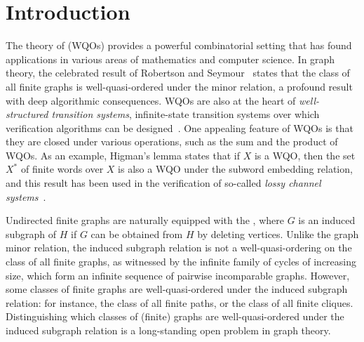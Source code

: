 \section{Introduction}
\label{sec:introduction}

\AP The theory of  (WQOs)
provides a powerful combinatorial setting that has found
applications in various areas of mathematics and computer
science. In graph theory, the celebrated result of
Robertson and Seymour~\cite{ROBSEY04} states that the
class of all finite graphs is well-quasi-ordered under
the minor relation, a profound result with deep
algorithmic consequences. WQOs are also at the heart of
\emph{well-structured transition systems}, infinite-state
transition systems over which verification algorithms can
be designed~\cite{ABDU96,ABDU98}. One appealing feature
of WQOs is that they are closed under various operations,
such as the sum and the product of WQOs. As an example,
Higman's lemma \cite{HIG52} states that if $X$ is a WQO,
then the set $X^*$ of finite words over $X$ is also a WQO
under the subword embedding relation, and this result has
been used in the verification of so-called \emph{lossy
channel systems}~\cite{ABDU93}.


\AP Undirected finite graphs are naturally equipped with the , where $G$ is an induced subgraph of $H$ if $G$ can be
obtained from $H$ by deleting vertices. Unlike
the graph minor relation, the induced subgraph relation is not a
well-quasi-ordering on the class of all finite graphs, as witnessed by the
infinite family of cycles of increasing size, which form an infinite sequence of 
pairwise incomparable graphs.
However, some classes of finite graphs are well-quasi-ordered under the induced
subgraph relation: for instance, the class of all finite paths, or the class of
all finite cliques. 
Distinguishing which classes of (finite) graphs are
well-quasi-ordered under the induced subgraph relation is a long-standing open
problem in graph theory.

